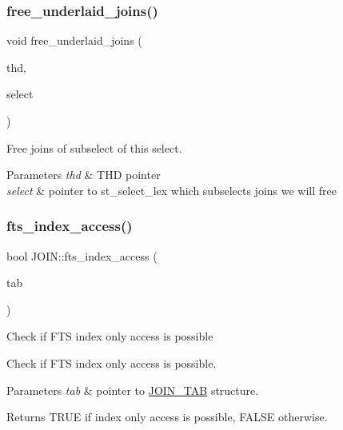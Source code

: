\subsubsection{\texorpdfstring{free\+\_\+underlaid\+\_\+joins()}{free\_underlaid\_joins()}}
{\footnotesize\ttfamily void free\+\_\+underlaid\+\_\+joins (\begin{DoxyParamCaption}\item[{T\+HD $\ast$}]{thd,  }\item[{S\+E\+L\+E\+C\+T\+\_\+\+L\+EX $\ast$}]{select }\end{DoxyParamCaption})}

Free joins of subselect of this select.


\begin{DoxyParams}{Parameters}
{\em thd} & T\+HD pointer \\
\hline
{\em select} & pointer to st\+\_\+select\+\_\+lex which subselects joins we will free \\
\hline
\end{DoxyParams}
\mbox{\label{group__Query__Optimizer_ga7c20a9b8d13f14275a4ee01f44f8cfa2}} 
\subsubsection{\texorpdfstring{fts\+\_\+index\+\_\+access()}{fts\_index\_access()}}
{\footnotesize\ttfamily bool J\+O\+I\+N\+::fts\+\_\+index\+\_\+access (\begin{DoxyParamCaption}\item[{\mbox{\hyperlink{classJOIN__TAB}{J\+O\+I\+N\+\_\+\+T\+AB}} $\ast$}]{tab }\end{DoxyParamCaption})}

Check if F\+TS index only access is possible

Check if F\+TS index only access is possible.


\begin{DoxyParams}{Parameters}
{\em tab} & pointer to \mbox{\hyperlink{classJOIN__TAB}{J\+O\+I\+N\+\_\+\+T\+AB}} structure.\\
\hline
\end{DoxyParams}
\begin{DoxyReturn}{Returns}
T\+R\+UE if index only access is possible, F\+A\+L\+SE otherwise. 
\end{DoxyReturn}
\mbox{\label{group__Query__Optimizer_ga92bf64a03ec666f565627fbb48ba4677}} 
